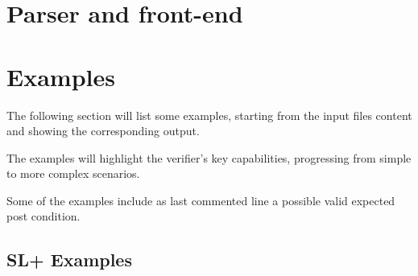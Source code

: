 \documentclass[parskip=half]{scrartcl}
\begin{document}
\section{Parser and front-end}

\section{Examples}

The following section will list some examples, starting from the input files content and showing the corresponding output.

The examples will highlight the verifier's key capabilities, progressing from simple to more complex scenarios.

Some of the examples include as last commented line a possible valid expected post condition.  

\subsection{SL+ Examples}
\end{document}
